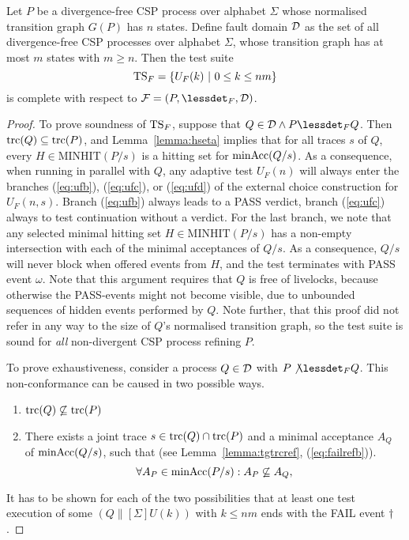 \begin{theorem}
Let $P$ be a divergence-free CSP process over alphabet $\Sigma$ 
whose normalised transition graph $G(P)$ has $n$ states. Define fault domain ${\cal D}$ as
the set of all divergence-free CSP processes over alphabet $\Sigma$, whose transition graph
has at most $m$ states with $m \ge n$. 
Then the test suite 
\[
{\text{TS}}_F = \{ U_F(k)~|~0 \le k \le nm  \}
\]
is complete with respect to ${\cal F} = (P,\lessdet_F,{\cal D})$.
\end{theorem}
\begin{proof}
To prove soundness of ${\text{TS}}_F$, suppose that $Q\in{\cal D} \wedge P\lessdet_F Q$. Then
$\text{trc}(Q)\subseteq \text{trc}(P)$, and Lemma~\ref{lemma:hseta} implies that 
for all traces $s$ of $Q$, every $H\in\text{MINHIT}(P/s)$ is a 
    hitting set for $\text{minAcc}(Q/s)$. As a consequence, when running in parallel
with $Q$, any adaptive test $U_F(n)$ will always enter the branches 
(\ref{eq:ufb}), (\ref{eq:ufc}),  or (\ref{eq:ufd}) of the external choice construction
for $U_F(n,s)$. Branch (\ref{eq:ufb}) always leads to a PASS verdict, branch (\ref{eq:ufc})
always to test continuation without a verdict. For the last branch, we note that 
any selected minimal hitting set $H\in\text{MINHIT}(P/s)$ has a non-empty intersection with
each of the minimal acceptances of $Q/s$. As a consequence, $Q/s$ will never block when offered events from $H$, and the test terminates with PASS event $\omega$. Note that this argument requires that $Q$ is free of livelocks, because otherwise the PASS-events might not become visible, due to unbounded sequences of hidden events performed by $Q$. Note further, that this proof did not refer in any way to the size of $Q$'s normalised transition graph, so the test suite is sound for {\it all} non-divergent CSP process refining $P$.

To prove exhaustiveness, consider a process $Q\in{\cal D}$ with $P\not\lessdet_F Q$. This non-conformance can be caused in two possible ways.
\begin{enumerate}
\item $\text{trc}(Q)\not\subseteq \text{trc}(P)$
\item There exists a joint trace $s\in\text{trc}(Q)\cap\text{trc}(P)$ and a minimal acceptance $A_Q$
of $\text{minAcc}(Q/s)$, such that 
(see Lemma~\ref{lemma:tgtrcref}, (\ref{eq:failrefb})).
\[
\forall A_P\in\text{minAcc}(P/s): A_P\not\subseteq A_Q,
\] 
\end{enumerate}
It has to be shown for each of the two possibilities that at least one test execution of some $(Q\parallel[\Sigma] U(k))$ with $k\le nm$ ends with the FAIL event $\dag$.
\xbox
\end{proof}



















